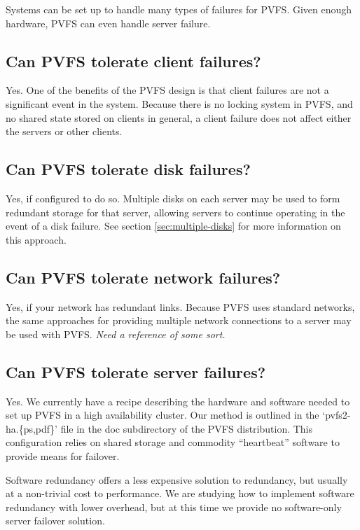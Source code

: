 \documentclass[11pt,letterpaper]{article}
\begin{document}
Systems can be set up to handle many types of failures for PVFS.  Given enough
hardware, PVFS can even handle server failure.

\subsection{Can PVFS tolerate client failures?}

Yes.  One of the benefits of the PVFS design is that client failures are not a
significant event in the system.  Because there is no locking system in PVFS,
and no shared state stored on clients in general, a client failure does not
affect either the servers or other clients.

\subsection{Can PVFS tolerate disk failures?}

Yes, if configured to do so.  Multiple disks on each server may be used to
form redundant storage for that server, allowing servers to continue operating
in the event of a disk failure.  See section \ref{sec:multiple-disks} for more
information on this approach.

\subsection{Can PVFS tolerate network failures?}

Yes, if your network has redundant links.  Because PVFS uses standard
networks, the same approaches for providing multiple network connections to a
server may be used with PVFS.  \emph{Need a reference of some sort.}

\subsection{Can PVFS tolerate server failures?}

Yes.  We currently have a recipe describing the hardware and software
needed to set up PVFS in a high availability cluster.  Our method is
outlined in the `pvfs2-ha.\{ps,pdf\}' file in the doc subdirectory of the
PVFS distribution.  This configuration relies on shared storage and
commodity ``heartbeat'' software to provide means for failover.

Software redundancy offers a less expensive solution to redundancy,
but usually at a non-trivial cost to performance.  We are studying how
to implement software redundancy with lower overhead, but at this time
we provide no software-only server failover solution.
\end{document}
